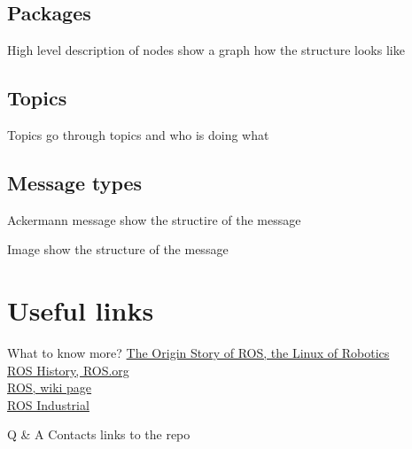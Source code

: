 \documentclass{beamer}
\begin{document}
\subsection{Packages}
\begin{frame}{High level description of nodes}
show a graph how the structure looks like
\end{frame}

\subsection{Topics}
\begin{frame}{Topics}
go through topics and who is doing what
\end{frame}

\subsection{Message types}
\begin{frame}{Ackermann message}
show the structire of the message
\end{frame}

\begin{frame}{Image}
show the structure of the message
\end{frame}

\section{Useful links}

\begin{frame}{What to know more?}
\href{https://spectrum.ieee.org/automaton/robotics/robotics-software/the-origin-story-of-ros-the-linux-of-robotics}{The Origin Story of ROS, the Linux of Robotics}\\
\href{https://www.ros.org/history/}{ROS History, ROS.org}\\
\href{https://en.wikipedia.org/wiki/Robot_Operating_System}{ROS, wiki page}\\
\href{http://wiki.ros.org/Industrial/Tutorials}{ROS Industrial}
\end{frame}

\begin{frame}{Q \& A}
Contacts
links to the repo
\end{frame}
\end{document}
